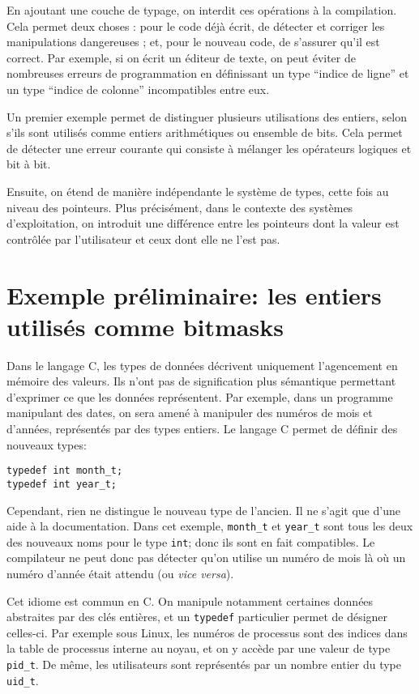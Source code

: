 En ajoutant une couche de typage, on interdit ces opérations à la compilation.
Cela permet deux choses : pour le code déjà écrit, de détecter et corriger les
manipulations dangereuses ; et, pour le nouveau code, de s'assurer qu'il est
correct. Par exemple, si on écrit un éditeur de texte, on peut éviter de
nombreuses erreurs de programmation en définissant un type \enquote{indice de
ligne} et un type \enquote{indice de colonne} incompatibles entre eux.

Un premier exemple permet de distinguer plusieurs utilisations des entiers,
selon s'ils sont utilisés comme entiers arithmétiques ou ensemble de bits. Cela
permet de détecter une erreur courante qui consiste à mélanger les opérateurs
logiques et bit à bit.

Ensuite, on étend de manière indépendante le système de types, cette fois au
niveau des pointeurs. Plus précisément, dans le contexte des systèmes
d'exploitation, on introduit une différence entre les pointeurs dont la valeur
est contrôlée par l'utilisateur et ceux dont elle ne l'est pas.

\section{Exemple préliminaire: les entiers utilisés comme bitmasks}

Dans le langage C, les types de données décrivent uniquement l'agencement en
mémoire des valeurs. Ils n'ont pas de signification plus sémantique permettant
d'exprimer ce que les données représentent. Par exemple, dans un programme
manipulant des dates, on sera amené à manipuler des numéros de mois et d'années,
représentés par des types entiers. Le langage C permet de définir des nouveaux
types:

\begin{verbatim}
typedef int month_t;
typedef int year_t;
\end{verbatim}

Cependant, rien ne distingue le nouveau type de l'ancien. Il ne s'agit que d'une
aide à la documentation. Dans cet exemple, \texttt{month\_t} et \texttt{year\_t}
sont tous les deux des nouveaux noms pour le type \texttt{int}; donc ils sont en
fait compatibles. Le compilateur ne peut donc pas détecter qu'on utilise un
numéro de mois là où un numéro d'année était attendu (ou \emph{vice versa}).

Cet idiome est commun en C. On manipule notamment certaines données abstraites
par des clés entières, et un \texttt{typedef} particulier permet de désigner
celles-ci. Par exemple sous Linux, les numéros de processus sont des indices
dans la table de processus interne au noyau, et on y accède par une valeur de
type \texttt{pid\_t}. De même, les utilisateurs sont représentés par un nombre
entier du type \texttt{uid\_t}.

